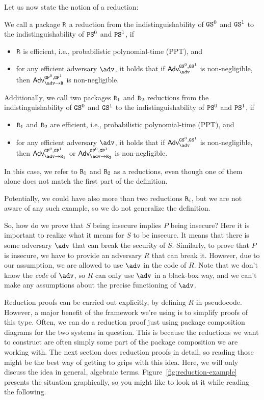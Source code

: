 Let us now state the notion of a reduction:
\begin{definition}[Reduction]
We call a package $\text{\texttt{R}}$ a reduction from the indistinguishability of $\text{\texttt{GS}}^0$ and  $\text{\texttt{GS}}^1$ to the indistinguishability of 
$\text{\texttt{PS}}^0$ and  $\text{\texttt{PS}}^1$, if
\begin{itemize}
\item $\text{\texttt{R}}$ is efficient, i.e., probabilistic polynomial-time (PPT), and
\item for any efficient adversary $\adv$, it holds that if $\mathsf{Adv}^{\M{GS}^0,\M{GS}^1}_\adv$ is non-negligible, then
      $\mathsf{Adv}^{\M{GP}^0,\M{GP}^1}_{\adv\rightarrow\M{R}}$ is non-negligible.
\end{itemize}
Additionally, we call two packages $\text{\texttt{R}}_1$ and $\text{\texttt{R}}_2$ reductions from the indistinguishability of $\text{\texttt{GS}}^0$ and  $\text{\texttt{GS}}^1$ to the indistinguishability of 
$\text{\texttt{PS}}^0$ and  $\text{\texttt{PS}}^1$, if
\begin{itemize}
\item $\text{\texttt{R}}_1$ and $\text{\texttt{R}}_2$ are efficient, i.e., probabilistic polynomial-time (PPT), and
\item for any efficient adversary $\adv$, it holds that if $\mathsf{Adv}^{\M{GS}^0,\M{GS}^1}_\adv$ is non-negligible, then
      $\mathsf{Adv}^{\M{GP}^0,\M{GP}^1}_{\adv\rightarrow\M{R}_1}$ or $\mathsf{Adv}^{\M{GP}^0,\M{GP}^1}_{\adv\rightarrow\M{R}_2}$ is non-negligible.
\end{itemize}
In this case, we refer to $\text{\texttt{R}}_1$ and $\text{\texttt{R}}_2$ as a reductions, even though one of them alone does not match the first
part of the definition.
\end{definition}
Potentially, we could have also more than two reductions $\text{\texttt{R}}_i$, but we are not aware of any such example,
so we do not generalize the definition.


\iffalse
So, how do we prove that $S$ being insecure implies $P$ being insecure? Here it is important to realize what it means for $S$ to be insecure. It means that there is some adversary $\adv$ that can break the security of $S$. Similarly, to prove that $P$ is insecure, we have to provide an adversary $R$ that can break it. However, due to our assumption, we are allowed to use $\adv$ in the code of $R$. Note that we don't know the \emph{code} of $\adv$, so $R$ can only use $\adv$ in a black-box way, and we can't make any assumptions about the precise functioning of $\adv$.

Reduction proofs can be carried out explicitly, by defining $R$ in pseudocode. However, a major benefit of the framework we're using is to simplify proofs of this type. Often, we can do a reduction proof just using package composition diagrams for the two systems in question. This is because the reductions we want to construct are often simply some part of the package composition we are working with. The next section does reduction proofs in detail, so reading those might be the best way of getting to grips with this idea. Here, we will only discuss the idea in general, algebraic terms. Figure~\ref{fig:reduction-example} presents the situation graphically, so you might like to look at it while reading the following.

